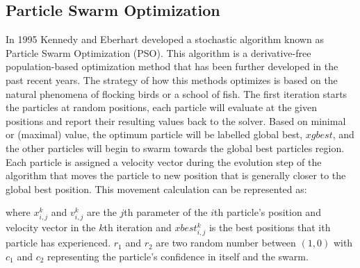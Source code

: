 \subsection{Particle Swarm Optimization}
In 1995 Kennedy and Eberhart \cite{Kennedy1995} developed a stochastic algorithm known as Particle Swarm Optimization (PSO). This algorithm is a derivative-free population-based optimization method that has been further developed in the past recent years. The strategy of how this methods optimizes is based on the natural phenomena of flocking birds or a school of fish. The first iteration starts the particles at random positions, each particle will evaluate at the given positions and
report their resulting values back to the solver. Based on minimal or (maximal) value, the optimum particle will be labelled global best, $xgbest$, and the other particles will begin to swarm towards the global best particles region. Each particle is assigned a velocity vector during the evolution step of the algorithm that moves the particle to new position that is generally closer to the global best position. This movement calculation can be represented as:
where $x^k_{i,j}$ and $v^k_{i,j}$ are the $j$th parameter of the $i$th particle's position and velocity vector in the $k$th iteration and $xbest^k_{i,j}$ is the best positions that ith particle has experienced. $r_1$ and $r_2$ are two random number between $(1,0)$ with $c_1$ and $c_2$ representing the particle's confidence in itself and the swarm. 

